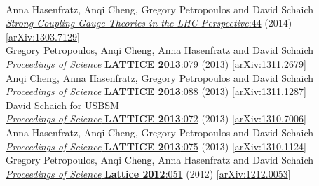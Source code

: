 \begin{spacelist}
\begin{revnumerate}
    \pagebreakitem
       \\
      Anna Hasenfratz, Anqi Cheng, Gregory Petropoulos and David Schaich \\
      \href{https://doi.org/10.1142/9789814566254_0004}{\textit{Strong Coupling Gauge Theories in the LHC Perspective}:44} (2014) [\href{http://arxiv.org/abs/1303.7129}{arXiv:1303.7129}]
    \pagebreakitem
       \\
      Gregory Petropoulos, Anqi Cheng, Anna Hasenfratz and David Schaich \\
      \href{https://doi.org/10.22323/1.187.0079}{\textit{Proceedings of Science} \textbf{LATTICE 2013}:079} (2013) [\href{http://arxiv.org/abs/1311.2679}{arXiv:1311.2679}]
    \pagebreakitem
       \\
      Anqi Cheng, Anna Hasenfratz, Gregory Petropoulos and David Schaich \\
      \href{https://doi.org/10.22323/1.187.0088}{\textit{Proceedings of Science} \textbf{LATTICE 2013}:088} (2013) [\href{http://arxiv.org/abs/1311.1287}{arXiv:1311.1287}]
    \pagebreakitem
       \\
      David Schaich for \href{http://bsm.physics.yale.edu}{USBSM} \\
      \href{https://doi.org/10.22323/1.187.0072}{\textit{Proceedings of Science} \textbf{LATTICE 2013}:072} (2013) [\href{http://arxiv.org/abs/1310.7006}{arXiv:1310.7006}]
    \pagebreakitem
       \\
      Anna Hasenfratz, Anqi Cheng, Gregory Petropoulos and David Schaich \\
      \href{https://doi.org/10.22323/1.187.0075}{\textit{Proceedings of Science} \textbf{LATTICE 2013}:075} (2013) [\href{http://arxiv.org/abs/1310.1124}{arXiv:1310.1124}]
    \pagebreakitem
       \\
      Gregory Petropoulos, Anqi Cheng, Anna Hasenfratz and David Schaich \\
      \href{https://doi.org/10.22323/1.164.0051}{\textit{Proceedings of Science} \textbf{Lattice 2012}:051} (2012) [\href{http://arxiv.org/abs/1212.0053}{arXiv:1212.0053}]
    \pagebreakitem
       \\

\end{revnumerate}
\end{spacelist}
